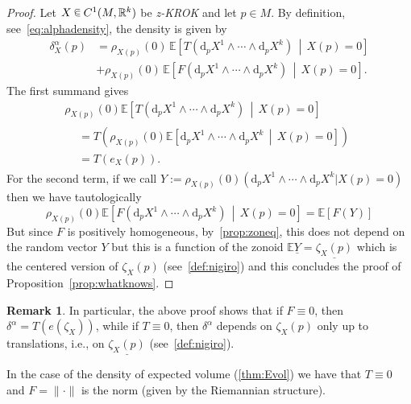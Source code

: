 \documentclass[10pt]{amsart}
\theoremstyle{definition}\newtheorem{defi}[theo]{Definition}\newtheorem{rema}[theo]{Remark}\newtheorem{exam}[theo]{Example}\newtheorem{exem}[theo]{Example}\newtheorem{nota}[theo]{Notation}
\newcommand{\R}{\mathbb{R}}
\newcommand{\EE}{\mathbb{E}}
\newcommand{\dd}{\mathrm{d}}
\newcommand{\seg}{\underline}
\newcommand{\zkrok}{\emph{z-KROK}\xspace}
\renewcommand{\a}{\alpha}
\newcommand*\randin{
\mathchoice {\raisebox{-.35ex}{$\displaystyle{^\subset}$}\mkern-11.5mu\raisebox{+.45ex}{$\displaystyle{_\subset}$}} {\mkern+1mu\raisebox{-.27ex}{$\textstyle{^\subset}$}\mkern-11.7mu\raisebox{+.45ex}{$\textstyle{_\subset}$}} {\raisebox{.35ex}{$\scriptstyle\subset$}\mkern-14mu\raisebox{-.15ex}{$\scriptstyle\subset$}} {\raisebox{.3ex}{$\scriptscriptstyle\subset$}\mkern-13.5mu\raisebox{-.10ex}{$\scriptscriptstyle\subset$}}}
\begin{document}
\begin{proof}
Let $X\,\randin\, C^1(M,\R^k)$ be \zkrok and let $p\in M$. By definition, see~\eqref{eq:alphadensity}, the density is given by
\begin{align*}
\delta_X^\alpha(p) &=\rho_{X(p)}(0)\, \EE\left[T\left(\dd_pX^1\wedge \cdots\wedge \dd_pX^k\right)\,\middle|\,X(p)=0\right] \\
&+\rho_{X(p)}(0)\, \EE\left[F\left(\dd_pX^1\wedge \cdots\wedge \dd_pX^k\right)\,\middle|\,X(p)=0\right].
\end{align*}
The first summand gives
\begin{multline}
\rho_{X(p)}(0)\EE\left[T\left(\dd_pX^1\wedge \cdots\wedge \dd_pX^k\right)\,\middle|\,X(p)=0\right]\\
\begin{aligned}
&=T\left(\rho_{X(p)}(0)\EE\left[\dd_pX^1\wedge \cdots\wedge \dd_pX^k\,\middle|\,X(p)=0\right]\right) \\
&=T(e_X(p)).
\end{aligned}
\end{multline}
For the second term, if we call $Y:=\rho_{X(p)}(0)(\dd_pX^1\wedge \cdots\wedge \dd_pX^k|X(p)=0)$ then we have tautologically
\begin{equation*}
\rho_{X(p)}(0)\EE\left[F\left(\dd_pX^1\wedge \cdots\wedge \dd_pX^k\right)\,\middle|\,X(p)=0\right]=\EE\left[F(Y)\right]
\end{equation*}
But since $F$ is positively homogeneous, by~\cref{prop:zoneq}, this does not depend on the random vector $Y$ but this is a function of the zonoid $\EE\seg{Y}=\seg{\zeta_X(p)}$ which is the centered version of $\zeta_X(p)$ (see~\cref{def:nigiro}) and this concludes the proof of Proposition~\ref{prop:whatknows}.
\end{proof}

\begin{rema}
In particular, the above proof shows that if $F\equiv 0$, then $\delta^\a=T(e(\zeta_X))$, while if $T\equiv 0$, then $\delta^\a$ depends on $\zeta_X(p)$ only up to translations, i.e., on $\underline{\zeta_X(p)}$ (see~\cref{def:nigiro}).
\end{rema}

In the case of the density of expected volume (\cref{thm:Evol}) we have that $T\equiv 0$ and $F=\|\cdot\|$ is the norm (given by the Riemannian structure).
\end{document}
